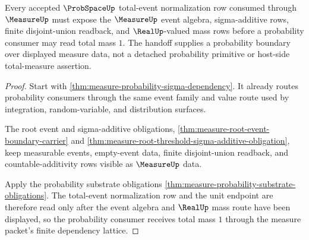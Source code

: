 \begin{theorem}\label{thm:measure-probspace-total-mass-handoff}
Every accepted $\ProbSpaceUp$ total-event normalization row consumed through $\MeasureUp$ must expose the $\MeasureUp$ event algebra, sigma-additive rows, finite disjoint-union readback, and $\RealUp$-valued mass rows before a probability consumer may read total mass $1$. The handoff supplies a probability boundary over displayed measure data, not a detached probability primitive or host-side total-measure assertion.
\end{theorem}
\begin{proof}
Start with \autoref{thm:measure-probability-sigma-dependency}. It already routes probability consumers through the same event family and value route used by integration, random-variable, and distribution surfaces.

The root event and sigma-additive obligations, \autoref{thm:measure-root-event-boundary-carrier} and \autoref{thm:measure-root-threshold-sigma-additive-obligation}, keep measurable events, empty-event data, finite disjoint-union readback, and countable-additivity rows visible as $\MeasureUp$ data.

Apply the probability substrate obligations \autoref{thm:measure-probability-substrate-obligations}. The total-event normalization row and the unit endpoint are therefore read only after the event algebra and $\RealUp$ mass route have been displayed, so the probability consumer receives total mass $1$ through the measure packet's finite dependency lattice.
\end{proof}
